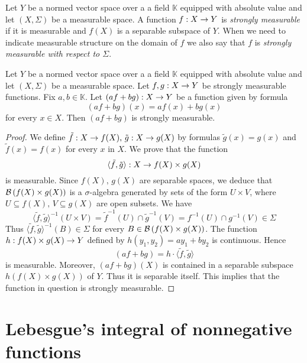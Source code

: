 \begin{definition}
Let $Y$ be a normed vector space over a a field $\mathbb{K}$ equipped with absolute value and let $(X,\Sigma)$ be a measurable space. A function $f:X\rightarrow Y$ is \textit{strongly measurable} if it is measurable and $f(X)$ is a separable subspace of $Y$. When we need to indicate measurable structure on the domain of $f$ we also say that $f$ is \textit{strongly measurable with respect to $\Sigma$}.
\end{definition}

\begin{proposition}\label{proposition:stronglymeasurableformvecotrspace}
Let $Y$ be a normed vector space over a a field $\mathbb{K}$ equipped with absolute value and let $(X,\Sigma)$ be a measurable space. Let $f, g:X\rightarrow Y$ be strongly measurable functions. Fix $a, b\in \mathbb{K}$. Let $(a f+ b g):X\rightarrow Y$ be a function given by formula
$$\left(a f + b g\right)(x) = af(x)+bg(x)$$
for every $x\in X$. Then $(a f+ b g)$ is strongly measurable.
\end{proposition}
\begin{proof}
We define $\tilde{f}:X\rightarrow f(X),\,\tilde{g}:X\rightarrow g(X)$ by formulas $\tilde{g}(x) = g(x)$ and $\tilde{f}(x) = f(x)$ for every $x$ in $X$. We prove that the function
$$\langle \tilde{f},\tilde{g}\rangle:X\rightarrow f(X)\times g(X)$$
is measurable. Since $f(X),\,g(X)$ are separable spaces, we deduce that ${\mathcal B}\left(f(X)\times g(X)\right)$ is a $\sigma$-algebra generated by sets of the form $U\times V$, where $U\subseteq f(X),\,V\subseteq g(X)$ are open subsets. We have
$$\langle \tilde{f},\tilde{g}\rangle^{-1}(U\times V) = \tilde{f}^{-1}(U)\cap \tilde{g}^{-1}(V) = f^{-1}(U)\cap g^{-1}(V) \in \Sigma$$
Thus $\langle \tilde{f},\tilde{g}\rangle^{-1}(B) \in \Sigma$ for every $B \in {\mathcal B}\left(f(X)\times g(X)\right)$.
The function $h:f(X)\times g(X)\rightarrow Y$ defined by $h (y_1, y_2)= ay_1 + by_2$ is continuous. Hence
$$\left(a f + b g\right) = h\cdot \langle \tilde{f},\tilde{g}\rangle$$
is measurable. Moreover, $\left(a f + b g\right)(X)$ is contained in a separable subspace $h\left(f(X)\times g(X)\right)$ of $Y$. Thus it is separable itself. This implies that the function in question is strongly measurable.
\end{proof}

\section{Lebesgue's integral of nonnegative functions}\label{section:lebesguesintegration}

